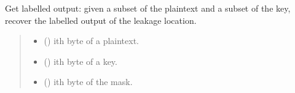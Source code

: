 \documentclass[letterpaper,10pt,english]{sphinxmanual}
\begin{document}
\begin{fulllineitems}
\begin{fulllineitems}
\end{fulllineitems}


\begin{fulllineitems}
\label{\detokenize{MLSCAlib.Ciphers:MLSCAlib.Ciphers.leakage_model.LeakageModel.get_imbalanced_classes}}
\pysigstartsignatures
{}
\pysigstopsignatures
\end{fulllineitems}


\begin{fulllineitems}
\label{\detokenize{MLSCAlib.Ciphers:MLSCAlib.Ciphers.leakage_model.LeakageModel.get_labelled_output}}
\pysigstartsignatures
{}
\pysigstopsignatures
\sphinxAtStartPar
Get labelled output: given a subset of the plaintext and a subset of the key,
recover the labelled output of the leakage location.
\begin{quote}\begin{description}
\begin{itemize}
\item {} 
\sphinxAtStartPar
{} () \textendash{} i\sphinxhyphen{}th byte of a plaintext.

\item {} 
\sphinxAtStartPar
{} () \textendash{} i\sphinxhyphen{}th byte of a key.

\item {} 
\sphinxAtStartPar
{} (\sphinxstyleliteralemphasis{\sphinxupquote{, }}) \textendash{} i\sphinxhyphen{}th byte of the mask.


\end{itemize}
\end{description}
\end{quote}
\end{fulllineitems}
\end{fulllineitems}
\end{document}
